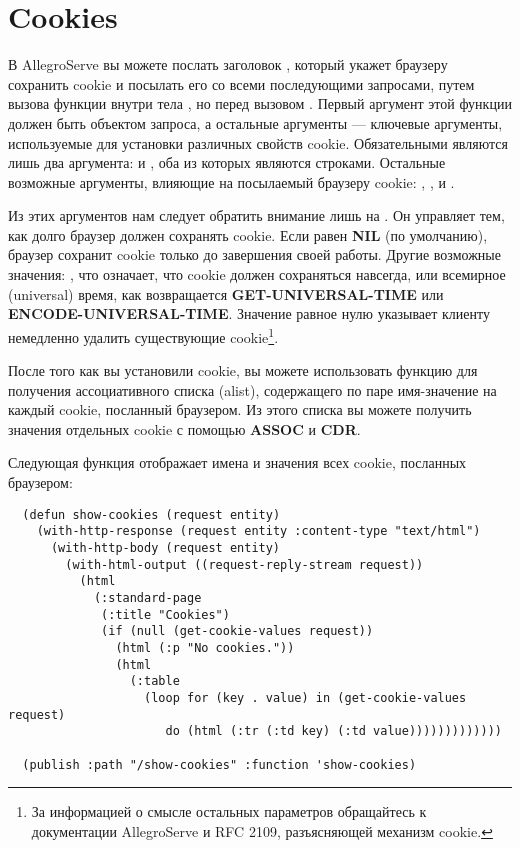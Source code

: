 \section{Cookies}

В AllegroServe вы можете послать заголовок , который укажет браузеру
сохранить cookie и посылать его со всеми последующими запросами, путем вызова функции
 внутри тела , но перед вызовом
. Первый аргумент этой функции должен быть объектом запроса, а
остальные аргументы --- ключевые аргументы, используемые для установки различных свойств
cookie. Обязательными являются лишь два аргумента:  и , оба из
которых являются строками. Остальные возможные аргументы, влияющие на посылаемый браузеру
cookie: , ,  и .

Из этих аргументов нам следует обратить внимание лишь на . Он управляет
тем, как долго браузер должен сохранять cookie. Если  равен \textbf{NIL}
(по умолчанию), браузер сохранит cookie только до завершения своей работы. Другие
возможные значения: , что означает, что cookie должен сохраняться навсегда,
или всемирное (universal) время, как возвращается \textbf{GET-UNIVERSAL-TIME} или
\textbf{ENCODE-UNIVERSAL-TIME}. Значение  равное нулю указывает клиенту
немедленно удалить существующие cookie\footnote{За информацией о смысле остальных
  параметров обращайтесь к документации AllegroServe и RFC 2109, разъясняющей механизм
  cookie.}.

После того как вы установили cookie, вы можете использовать функцию
 для получения ассоциативного списка (alist), содержащего по паре
имя-значение на каждый cookie, посланный браузером. Из этого списка вы можете получить
значения отдельных cookie с помощью \textbf{ASSOC} и \textbf{CDR}.

Следующая функция отображает имена и значения всех cookie, посланных браузером:

\begin{lstlisting}
  (defun show-cookies (request entity)
    (with-http-response (request entity :content-type "text/html")
      (with-http-body (request entity)
        (with-html-output ((request-reply-stream request))
          (html
            (:standard-page
             (:title "Cookies")
             (if (null (get-cookie-values request))
               (html (:p "No cookies."))
               (html 
                 (:table
                   (loop for (key . value) in (get-cookie-values request)
                      do (html (:tr (:td key) (:td value)))))))))))))

  (publish :path "/show-cookies" :function 'show-cookies)
\end{lstlisting}

